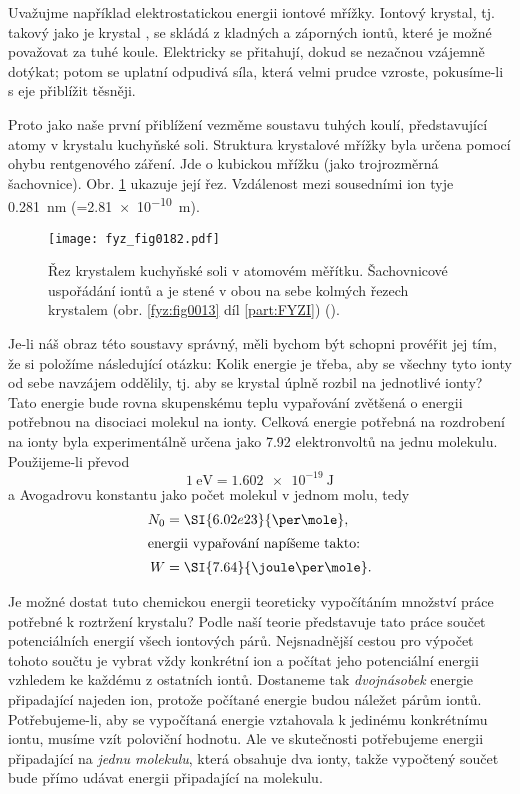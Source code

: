     Uvažujme například elektrostatickou energii iontové mřížky. Iontový krystal, tj. takový jako je
    krystal , se skládá z kladných a záporných iontů, které je možné považovat za tuhé
    koule. Elektricky se přitahují, dokud se nezačnou vzájemně dotýkat; potom se uplatní odpudivá
    síla, která velmi prudce vzroste, pokusíme-li s eje přiblížit těsněji.
    
    Proto jako naše první přiblížení vezměme soustavu tuhých koulí, představující atomy v krystalu
    kuchyňské soli. Struktura krystalové mřížky byla určena pomocí ohybu rentgenového záření. Jde o
    kubickou mřížku (jako trojrozměrná šachovnice). Obr. \ref{fyz:fig0182} ukazuje její řez.
    Vzdálenost mezi sousedními ion tyje \SI{0.281}{\nm} (=\SI{2.81e-10}{\m}).
    
    \begin{figure}[ht!]  %
      \centering
      \texttt{[image: fyz\_fig0182.pdf]}
      \caption{Řez krystalem kuchyňské soli v atomovém měřítku. Šachovnicové uspořádání iontů  
              a  je stené v obou na sebe kolmých řezech krystalem (obr. \ref{fyz:fig0013} díl
              \ref{part:FYZI}) (\cite[s.~146]{Feynman02}).}
      \label{fyz:fig0182}
    \end{figure}

    Je-li náš obraz této soustavy správný, měli bychom být schopni provéřit jej tím, že si položíme
    následující otázku: Kolik energie je třeba, aby se všechny tyto ionty od sebe navzájem oddělily,
    tj. aby se krystal úplně rozbil na jednotlivé ionty? Tato energie bude rovna skupenskému teplu
    vypařování  zvětšená o energii potřebnou na disociaci molekul na ionty. Celková energie
    potřebná na rozdrobení  na ionty byla experimentálně určena jako \num{7.92}
    elektronvoltů na jednu molekulu. Použijeme-li převod
    \begin{equation*}
      \SI{1}{\electronvolt} = \SI{1.602e-19}{\joule}
    \end{equation*}
    a Avogadrovu konstantu jako počet molekul v jednom molu, tedy
    \begin{align*}
      N_0 &= \SI{6.02e23}{\per\mole},  \\
      \shortintertext{energii vypařování napíšeme takto:}
      W   &= \SI{7.64}{\joule\per\mole}.
    \end{align*}

    Je možné dostat tuto chemickou energii teoreticky vypočítáním množství práce potřebné k
    roztržení krystalu? Podle naší teorie představuje tato práce součet potenciálních energií všech
    iontových párů. Nejsnadnější cestou pro výpočet tohoto součtu je vybrat vždy konkrétní ion a
    počítat jeho potenciální energii vzhledem ke každému z ostatních iontů. Dostaneme tak
    \emph{dvojnásobek} energie připadající najeden ion, protože počítané energie budou náležet párům
    iontů. Potřebujeme-li, aby se vypočítaná energie vztahovala k jedinému konkrétnímu iontu, musíme
    vzít poloviční hodnotu. Ale ve skutečnosti potřebujeme energii připadající na \emph{jednu
    molekulu}, která obsahuje dva ionty, takže vypočtený součet bude přímo udávat energii
    připadající na molekulu.


